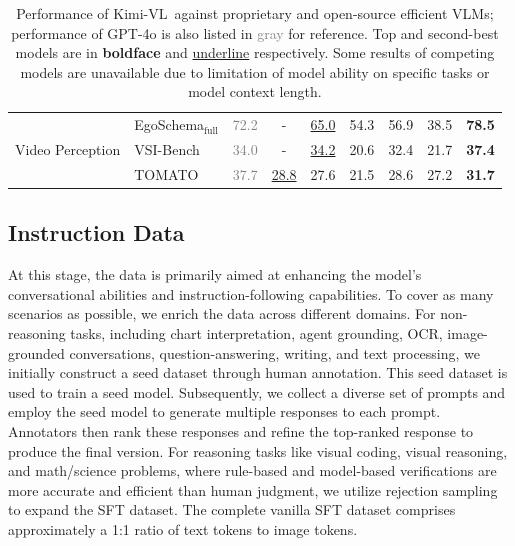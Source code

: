 \documentclass{article}
\newcommand{\ourname}{{Kimi-VL}}
\newcommand{\gpto}[1]{\textcolor{gray}{#1}}
\begin{document}
\begin{table}[h!]
\begin{tabular}{@{}c l |  c c | c  c c | c c@{}}
    \multirow{3}{66pt}{Video Perception} 
    & EgoSchema$_{\text{full}}$   &  \gpto{72.2} &  - & \underline{65.0}  &  54.3 & 56.9  & 38.5 & \textbf{78.5} \\ 
    & VSI-Bench           &  \gpto{34.0} & -  & \underline{34.2}  & 20.6  & 32.4  & 21.7 & \textbf{37.4} \\ 
    & TOMATO        &  \gpto{37.7} & \underline{28.8}  & 27.6  & 21.5  & 28.6  & 27.2 & \textbf{31.7}  \\

    
    
    \bottomrule
    \end{tabular}
    \vspace{1em}
    \caption{Performance of \ourname~against proprietary and open-source efficient VLMs; performance of GPT-4o is also listed in \gpto{gray} for reference. Top and second-best models are in \textbf{boldface} and \underline{underline} respectively. Some results of competing models are unavailable due to limitation of model ability on specific tasks or model context length. }
    \label{tab:short_perf}
    \vspace{-1em}
\end{table}


\subsection{Instruction Data}

\label{sec:3.2}

At this stage, the data is primarily aimed at enhancing the model's conversational abilities and instruction-following capabilities. To cover as many scenarios as possible, we enrich the data across different domains.
For non-reasoning tasks, including chart interpretation, agent grounding, OCR, image-grounded conversations, question-answering, writing, and text processing, we initially construct a seed dataset through human annotation. This seed dataset is used to train a seed model. Subsequently, we collect a diverse set of prompts and employ the seed model to generate multiple responses to each prompt. Annotators then rank these responses and refine the top-ranked response to produce the final version. For reasoning tasks like visual coding, visual reasoning, and math/science problems, where rule-based and model-based verifications are more accurate and efficient than human judgment, we utilize rejection sampling to expand the SFT dataset.
The complete vanilla SFT dataset comprises approximately a 1:1 ratio of text tokens to image tokens.
\end{document}

